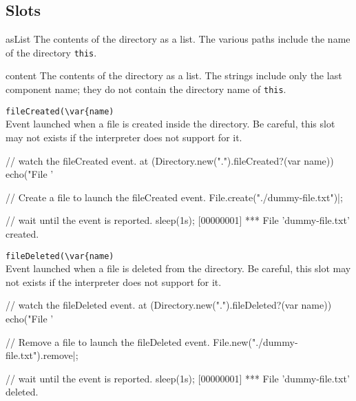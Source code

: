 \subsection{Slots}
\begin{urbiscriptapi}
\item[asList]
  The contents of the directory as a  list.  The
  various paths include the name of the directory \lstinline|this|.

\item[content]
  The contents of the directory as a  list.  The
  strings include only the last component name; they do not contain
  the directory name of \lstinline|this|.

\item \lstinline|fileCreated(\var{name)|\\
  Event launched when a file is created inside the directory.  Be careful,
  this slot may not exists if the \us interpreter does not support for it.

\begin{urbiscript}
// watch the fileCreated event.
at (Directory.new(".").fileCreated?(var name))
  echo("File '%

// Create a file to launch the fileCreated event.
File.create("./dummy-file.txt")|;

// wait until the event is reported.
sleep(1s);
[00000001] *** File 'dummy-file.txt' created.
\end{urbiscript}

\item \lstinline|fileDeleted(\var{name)|\\
  Event launched when a file is deleted from the directory.  Be careful,
  this slot may not exists if the \us interpreter does not support for it.

\begin{urbiscript}
// watch the fileDeleted event.
at (Directory.new(".").fileDeleted?(var name))
  echo("File '%

// Remove a file to launch the fileDeleted event.
File.new("./dummy-file.txt").remove|;

// wait until the event is reported.
sleep(1s);
[00000001] *** File 'dummy-file.txt' deleted.
\end{urbiscript}


\end{urbiscriptapi}


